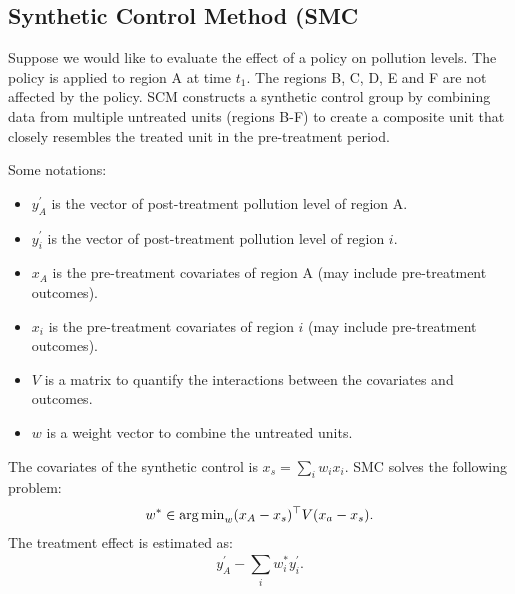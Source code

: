 \subsection{Synthetic Control Method (SMC}
    Suppose we would like to evaluate the effect of a policy on pollution levels. 
    The policy is applied to region A at time $t_1$. 
    The regions B, C, D, E and F are not affected by the policy. 
    SCM constructs a synthetic control group by combining data from multiple untreated units (regions B-F) to create a composite unit that closely resembles the treated unit in the pre-treatment period. 

    Some notations:
        \begin{itemize}
            \item $y^\prime_{A}$ is the vector of post-treatment pollution level of region A.
            \item $y^\prime_{i}$ is the vector of post-treatment pollution level of region $i$.
            \item $x_A$ is the pre-treatment covariates of region A (may include pre-treatment outcomes).
            \item $x_i$ is the pre-treatment covariates of region $i$ (may include pre-treatment outcomes).
            \item $V$ is a matrix to quantify the interactions between the covariates and outcomes. 
            \item $w$ is a weight vector to combine the untreated units. 
        \end{itemize}
    The covariates of the synthetic control is $x_s = \sum_{i}^{}{w_i x_i}$.
    SMC solves the following problem:
        \begin{equation}
            \begin{aligned}
                 w^\ast \in \operatorname{arg\,min}_{w} (x_A - x_s)^\top V (x_a - x_s).
            \end{aligned}
        \end{equation}
    The treatment effect is estimated as:
        \begin{equation}
            y^\prime_A - \sum_{i}^{}{w^\ast_i y^\prime_i}.
        \end{equation}